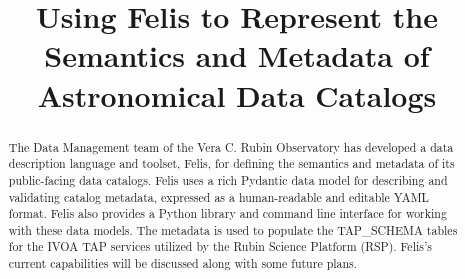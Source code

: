 \documentclass[11pt,twoside]{article}
\begin{document}
\title{Using Felis to Represent the Semantics and Metadata of Astronomical Data Catalogs}




\begin{abstract}
    The Data Management team of the Vera C. Rubin Observatory has developed a data description language and toolset, Felis, for defining the semantics and metadata of its public-facing data catalogs. Felis uses a rich Pydantic data model for describing and validating catalog metadata, expressed as a human-readable and editable YAML format. Felis also provides a Python library and command line interface for working with these data models. The metadata is used to populate the TAP\_SCHEMA tables for the IVOA TAP services utilized by the Rubin Science Platform (RSP). Felis's current capabilities will be discussed along with some future plans.
\end{abstract}


\end{document}

